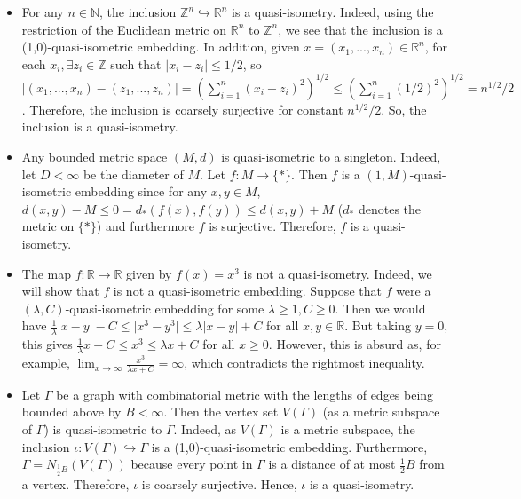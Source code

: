 \documentclass[12pt]{article}
\begin{document}
 	\begin{itemize}
 		\item For any $n \in \mathbb{N}$, the inclusion $\mathbb{Z}^n \hookrightarrow \mathbb{R}^n$ is a quasi-isometry. Indeed, using the restriction of the Euclidean metric on $\mathbb{R}^n$ to $\mathbb{Z}^n$, we see that the inclusion is a (1,0)-quasi-isometric embedding. In addition, given $x = (x_1,...,x_n) \in \mathbb{R}^n$, for each $x_i, \exists z_i \in \mathbb{Z}$ such that $\vert x_i - z_i \vert \leq 1/2$, so $\vert(x_1,...,x_n) - (z_1,...,z_n) \vert = (\sum_{i=1}^n (x_i - z_i)^2)^{1/2} \leq (\sum_{i=1}^n (1/2)^2)^{1/2} = n^{1/2}/2$. Therefore, the inclusion is coarsely surjective for constant $n^{1/2}/2$. So, the inclusion is a quasi-isometry. 
 		\item Any bounded metric space $(M,d)$ is quasi-isometric to a singleton. Indeed, let $D < \infty$ be the diameter of $M$. Let $f: M \rightarrow \{*\}$. Then $f$ is a $(1, M)$-quasi-isometric embedding since for any $x,y \in M$, $d(x,y) - M \leq 0 = d_*(f(x), f(y)) \leq d(x,y) + M$ ($d_*$ denotes the metric on $\{*\}$) and furthermore $f$ is surjective. Therefore, $f$ is a quasi-isometry. 
 		\item The map $f: \mathbb{R} \rightarrow \mathbb{R}$ given by $f(x) = x^3$ is not a quasi-isometry. Indeed, we will show that $f$ is not a quasi-isometric embedding. Suppose that $f$ were a $(\lambda, C)$-quasi-isometric embedding for some $\lambda \geq 1, C \geq 0$. Then we would have $\frac{1}{\lambda} \vert x - y \vert - C \leq \vert x^3 - y^3 \vert \leq \lambda \vert x - y \vert + C$ for all $x,y \in \mathbb{R}$. But taking $y = 0$, this gives $\frac{1}{\lambda}x - C \leq x^3 \leq \lambda x + C$ for all $x \geq 0$. However, this is absurd as, for example, $\lim_{x \rightarrow \infty} \frac{x^3}{\lambda x + C} = \infty$, which contradicts the rightmost inequality. 
 		\item Let $\Gamma$ be a graph with combinatorial metric with the lengths of edges being bounded above by $B < \infty$. Then the vertex set $V(\Gamma)$ (as a metric subspace of $\Gamma$) is quasi-isometric to $\Gamma$. Indeed, as $V(\Gamma)$ is a metric subspace, the inclusion $\iota: V(\Gamma) \hookrightarrow \Gamma$ is a (1,0)-quasi-isometric embedding. Furthermore, $\Gamma = N_{\frac{1}{2} B} (V(\Gamma))$ because every point in $\Gamma$ is a distance of at most $\frac{1}{2} B$ from a vertex. Therefore, $\iota$ is coarsely surjective. Hence, $\iota$ is a quasi-isometry.
 	\end{itemize}
 
\end{document}
